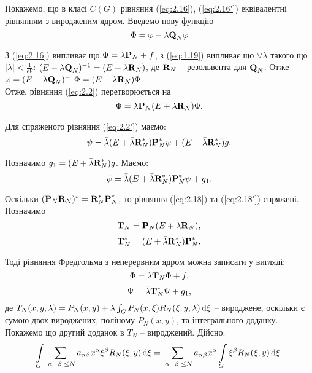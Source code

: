 Покажемо, що в класі $C(G)$ рівняння (\ref{eq:2.16}), (\ref{eq:2.16'}) еквівалентні рівнянням з виродженим ядром. Введемо нову функцію 
\begin{equation}
	\label{eq:2.17}
	\Phi = \phi - \lambda \bf{Q}_N \phi
\end{equation}

З (\ref{eq:2.16}) випливає що $\Phi = \lambda \bf{P}_N + f$, з (\ref{eq:1.19}) випливає що $\forall \lambda$ такого що $|\lambda| < \frac{1}{\epsilon V}$: $(E - \lambda \bf{Q}_N)^{-1} = (E + \lambda \bf{R}_N)$, де $\bf{R}_N$ -- резольвента для $\bf{Q}_N$. Отже $\phi = (E - \lambda \bf{Q}_N)^{-1} \Phi = (E + \lambda \bf{R}_N) \Phi$. \\

Отже, рівняння (\ref{eq:2.2}) перетворюється на 
\begin{equation}
	\label{eq:2.18}
	\Phi = \lambda \bf{P}_N (E + \lambda \bf{R}_N) \Phi.
\end{equation}

Для спряженого рівняння (\ref{eq:2.2'}) маємо:
\[ \psi = \bar \lambda (E + \bar \lambda \bf{R}_N^*) \bf{P}_N^* \psi + (E + \bar \lambda \bf{R}_N^*) g. \]

Позначимо $g_1 = (E + \bar \lambda \bf{R}_N^*) g$. Маємо:
\begin{equation}
	\label{eq:2.18'}
	\psi = \bar \lambda (E + \bar \lambda \bf{R}_N^*) \bf{P}_N^* \psi + g_1.
\end{equation}

Оскільки $(\bf{P}_N \bf{R}_N)^* = \bf{R}_N^* \bf{P}_N^*$, то рівняння (\ref{eq:2.18}) та (\ref{eq:2.18'}) спряжені. \\

Позначимо 
\begin{equation}
	\label{eq:2.19}
	\bf{T}_N = \bf{P}_N (E + \lambda \bf{R}_N),
\end{equation}
\begin{equation}
	\label{eq:2.19'}
	\bf{T}_N^* = (E + \bar \lambda \bf{R}_N^*) \bf{P}_N^*.
\end{equation}

Тоді рівняння Фредгольма з неперервним ядром можна записати у вигляді:
\begin{equation}
	\label{eq:2.20}
	\Phi = \lambda \bf{T}_N \Phi + f,
\end{equation}
\begin{equation}
	\label{eq:2.20'}
	\Psi = \bar \lambda \bf{T}_N^* \Psi + g_1,
\end{equation}
де $T_N(x, y, \lambda) = P_N(x, y) + \lambda \int_G P_N(x, \xi) R_N(\xi, y, \lambda) \diff \xi$ -- вироджене, оскільки є сумою двох вироджених, поліному $P_N(x, y)$, та інтегрального доданку. Покажемо що другий доданок в $T_N$ -- вироджений. Дійсно:
\[ \Int_G \Sum_{|\alpha + \beta| \le N} a_{\alpha \beta} x^\alpha \xi^\beta R_N(\xi, y) \diff \xi = \Sum_{|\alpha + \beta| \le N} a_{\alpha \beta} x^\alpha \Int_G \xi^\beta R_N(\xi, y) \diff \xi. \]

